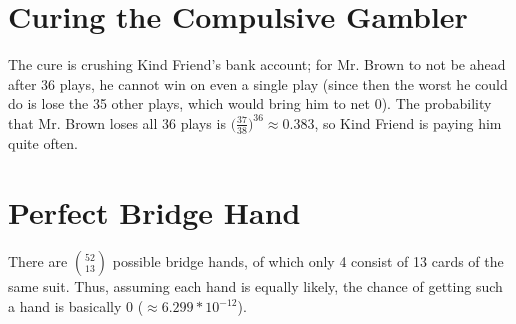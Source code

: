 \documentclass{article}
\begin{document}
\section{Curing the Compulsive Gambler}
The cure is crushing Kind Friend's bank account; for Mr. Brown to not be ahead after 36 plays, he cannot win
on even a single play (since then the worst he could do is lose the 35 other plays, which would bring him to
net 0). The probability that Mr. Brown loses all 36 plays is $\bigg(\frac{37}{38}\bigg)^{36} \approx 0.383$,
so Kind Friend is paying him quite often.

\section{Perfect Bridge Hand}
There are $\binom{52}{13}$ possible bridge hands, of which only 4 consist of 13 cards of the same suit.
Thus, assuming each hand is equally likely,
the chance of getting such a hand is basically 0 ($\approx 6.299 * 10^{-12}$).
\end{document}
